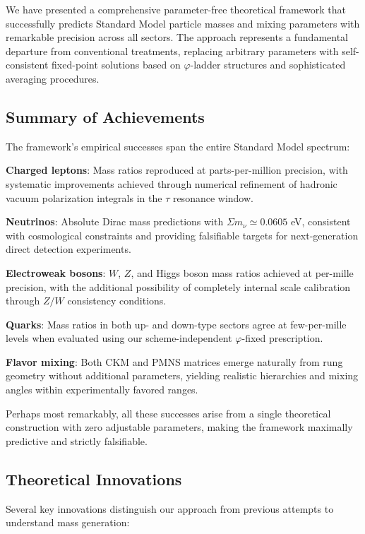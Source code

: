 \documentclass[%
amsmath,amssymb,
aps,
prb,
floatfix,
twocolumn
]{revtex4-2}
\begin{document}
We have presented a comprehensive parameter-free theoretical framework that successfully predicts Standard Model particle masses and mixing parameters with remarkable precision across all sectors. The approach represents a fundamental departure from conventional treatments, replacing arbitrary parameters with self-consistent fixed-point solutions based on $\varphi$-ladder structures and sophisticated averaging procedures.

\subsection{Summary of Achievements}

The framework's empirical successes span the entire Standard Model spectrum:

\textbf{Charged leptons}: Mass ratios reproduced at parts-per-million precision, with systematic improvements achieved through numerical refinement of hadronic vacuum polarization integrals in the $\tau$ resonance window.

\textbf{Neutrinos}: Absolute Dirac mass predictions with $\Sigma m_\nu \simeq 0.0605$ eV, consistent with cosmological constraints and providing falsifiable targets for next-generation direct detection experiments.

\textbf{Electroweak bosons}: $W$, $Z$, and Higgs boson mass ratios achieved at per-mille precision, with the additional possibility of completely internal scale calibration through $Z/W$ consistency conditions.

\textbf{Quarks}: Mass ratios in both up- and down-type sectors agree at few-per-mille levels when evaluated using our scheme-independent $\varphi$-fixed prescription.

\textbf{Flavor mixing}: Both CKM and PMNS matrices emerge naturally from rung geometry without additional parameters, yielding realistic hierarchies and mixing angles within experimentally favored ranges.

Perhaps most remarkably, all these successes arise from a single theoretical construction with zero adjustable parameters, making the framework maximally predictive and strictly falsifiable.

\subsection{Theoretical Innovations}

Several key innovations distinguish our approach from previous attempts to understand mass generation:
\end{document}
